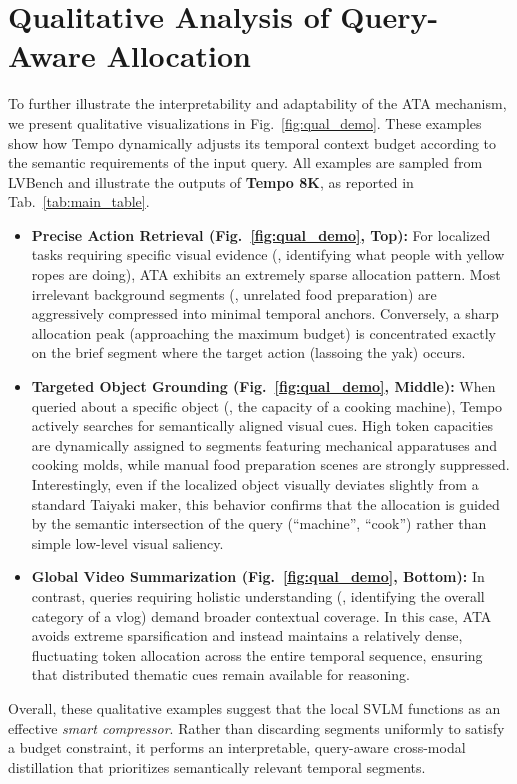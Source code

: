 \section{Qualitative Analysis of Query-Aware Allocation}
\label{supp:qualitative}

To further illustrate the interpretability and adaptability of the ATA mechanism, we present qualitative visualizations in Fig.~\ref{fig:qual_demo}. These examples show how Tempo dynamically adjusts its temporal context budget according to the semantic requirements of the input query. All examples are sampled from LVBench and illustrate the outputs of \textbf{Tempo 8K}, as reported in Tab.~\ref{tab:main_table}.

\begin{itemize}
\item \textbf{Precise Action Retrieval (Fig.~\ref{fig:qual_demo}, Top):}
For localized tasks requiring specific visual evidence (\eg, identifying what people with yellow ropes are doing), ATA exhibits an extremely sparse allocation pattern. Most irrelevant background segments (\eg, unrelated food preparation) are aggressively compressed into minimal temporal anchors. Conversely, a sharp allocation peak (approaching the maximum budget) is concentrated exactly on the brief segment where the target action (lassoing the yak) occurs.
\item \textbf{Targeted Object Grounding (Fig.~\ref{fig:qual_demo}, Middle):}
When queried about a specific object (\eg, the capacity of a cooking machine), Tempo actively searches for semantically aligned visual cues. High token capacities are dynamically assigned to segments featuring mechanical apparatuses and cooking molds, while manual food preparation scenes are strongly suppressed. Interestingly, even if the localized object visually deviates slightly from a standard Taiyaki maker, this behavior confirms that the allocation is guided by the semantic intersection of the query (``machine'', ``cook'') rather than simple low-level visual saliency.
\item \textbf{Global Video Summarization (Fig.~\ref{fig:qual_demo}, Bottom):}
In contrast, queries requiring holistic understanding (\eg, identifying the overall category of a vlog) demand broader contextual coverage. In this case, ATA avoids extreme sparsification and instead maintains a relatively dense, fluctuating token allocation across the entire temporal sequence, ensuring that distributed thematic cues remain available for reasoning.
\end{itemize}
%
Overall, these qualitative examples suggest that the local SVLM functions as an effective \emph{smart compressor}. Rather than discarding segments uniformly to satisfy a budget constraint, it performs an interpretable, query-aware cross-modal distillation that prioritizes semantically relevant temporal segments.